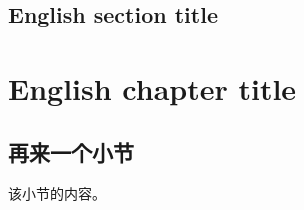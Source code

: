 \documentclass[a4paper,twoside]{ctexbook}
\begin{document}
\section{English section title}

\lipsum[2-5]

\chapter{English chapter title}

{
  \hypersetup{hidelinks}
  \minitoc
}

\vspace{10ex}

\lipsum[3]


\section{再来一个小节}

该小节的内容。
\end{document}
